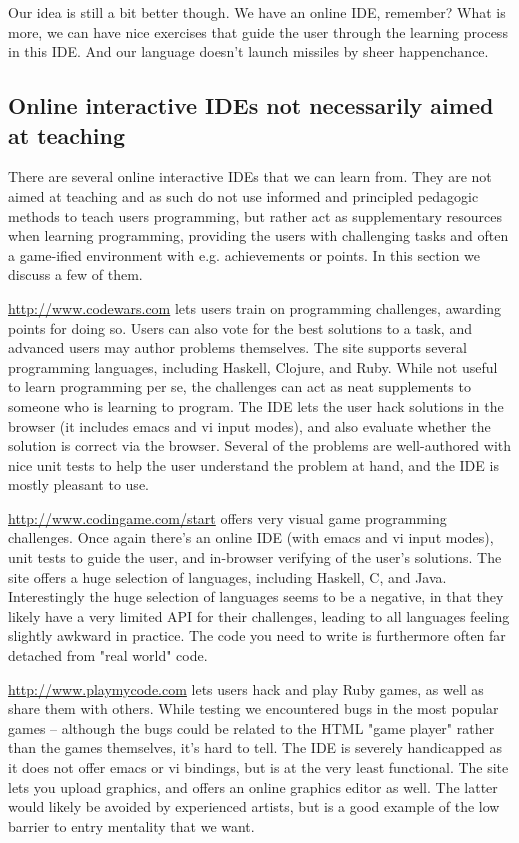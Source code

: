 Our idea is still a bit better though. We have an online IDE, remember? What 
is more, we can have nice exercises that guide the user through the learning 
process in this IDE. And our language doesn't launch missiles by sheer 
happenchance.

\subsection{Online interactive IDEs not necessarily aimed at teaching}
There are several online interactive IDEs that we can learn from. They are not 
aimed at teaching and as such do not use informed and principled pedagogic 
methods to teach users programming, but rather act as supplementary resources 
when learning programming, providing the users with challenging tasks and 
often a game-ified environment with e.g. achievements or points. In this 
section we discuss a few of them.

\url{http://www.codewars.com} lets users train on programming challenges, 
awarding points for doing so. Users can also vote for the best solutions to a
task, and advanced users may author problems themselves. The site supports 
several programming languages, including Haskell, Clojure, and Ruby. While not
useful to learn programming per se, the challenges can act as neat supplements 
to someone who is learning to program. The IDE lets the user hack solutions 
in the browser (it includes emacs and vi input modes), and also evaluate 
whether the solution is correct via the browser. Several of the problems are 
well-authored with nice unit tests to help the user understand the problem at 
hand, and the IDE is mostly pleasant to use.

\url{http://www.codingame.com/start} offers very visual game programming 
challenges. Once again there's an online IDE (with emacs and vi input modes), 
unit tests to guide the user, and in-browser verifying of the user's 
solutions. The site offers a huge selection of languages, including Haskell, 
C, and Java. Interestingly the huge selection of languages seems to be a 
negative, in that they likely have a very limited API for their challenges, 
leading to all languages feeling slightly awkward in practice. The code you 
need to write is furthermore often far detached from "real world" code.

\url{http://www.playmycode.com} lets users hack and play Ruby games, as well as
share them with others. While testing we encountered bugs in the most popular
games -- although the bugs could be related to the HTML "game player" rather
than the games themselves, it's hard to tell. The IDE is severely handicapped
as it does not offer emacs or vi bindings, but is at the very least functional.
The site lets you upload graphics, and offers an online graphics editor as
well. The latter would likely be avoided by experienced artists, but is a
good example of the low barrier to entry mentality that we want.

